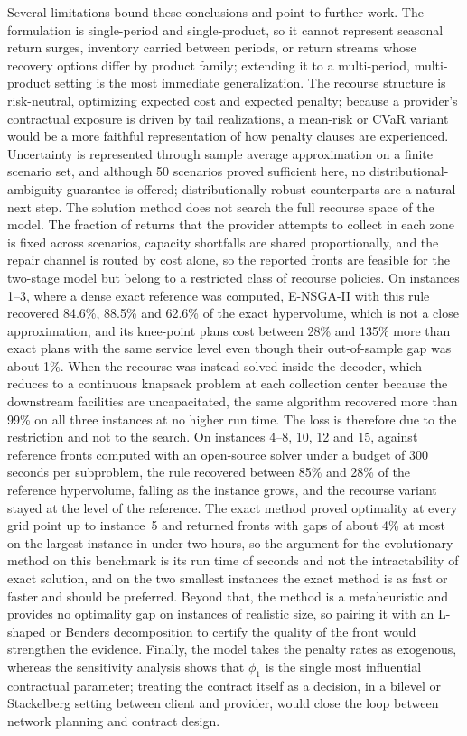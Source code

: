 \documentclass[11pt, a4paper]{article}
\begin{document}
Several limitations bound these conclusions and point to further work. The formulation is single-period and single-product, so it cannot represent seasonal return surges, inventory carried between periods, or return streams whose recovery options differ by product family; extending it to a multi-period, multi-product setting is the most immediate generalization. The recourse structure is risk-neutral, optimizing expected cost and
expected penalty; because a provider's contractual exposure is driven by tail realizations, a mean-risk or CVaR variant would be a more faithful representation of how penalty clauses are experienced. Uncertainty is represented through sample average approximation on a finite scenario set, and although 50 scenarios proved sufficient here, no distributional-ambiguity guarantee is offered; distributionally robust counterparts are
a natural next step. The solution method does not search the full recourse space of the model. The fraction of returns that the provider attempts to collect in each zone is fixed across scenarios, capacity shortfalls are shared proportionally, and the repair channel is routed by cost alone, so the reported fronts are feasible for the two-stage model but belong to a restricted class of recourse policies. On instances 1--3, where a dense exact reference was computed, E-NSGA-II with this rule recovered 84.6\%, 88.5\% and 62.6\% of the exact hypervolume, which is not a close approximation, and its knee-point plans cost between 28\% and 135\% more than exact plans with the same service level even though their out-of-sample gap was about 1\%. When the recourse was instead solved inside the decoder, which reduces to a continuous knapsack problem at each collection center because the downstream facilities are uncapacitated, the same algorithm recovered more than 99\% on all three instances at no higher run time. The loss is therefore due to the restriction and not to the search. On instances 4--8, 10, 12 and 15, against reference fronts computed with an open-source solver under a budget of 300 seconds per subproblem, the rule recovered between 85\% and 28\% of the reference hypervolume, falling as the instance grows, and the recourse variant stayed at the level of the reference. The exact method proved optimality at every grid point up to instance~5 and returned fronts with gaps of about 4\% at most on the largest instance in under two hours, so the argument for the evolutionary method on this benchmark is its run time of seconds and not the intractability of exact solution, and on the two smallest instances the exact method is as fast or faster and should be preferred. Beyond that, the method is a metaheuristic and provides no optimality gap on instances of realistic size, so pairing it with an L-shaped or Benders decomposition to certify the quality of the front would strengthen the evidence. Finally, the model takes the penalty rates as exogenous, whereas the sensitivity analysis shows that $\phi_1$ is the single most influential contractual parameter; treating the contract itself as a decision, in a bilevel or Stackelberg setting between client and provider, would close the loop between network planning and contract design.
\end{document}
